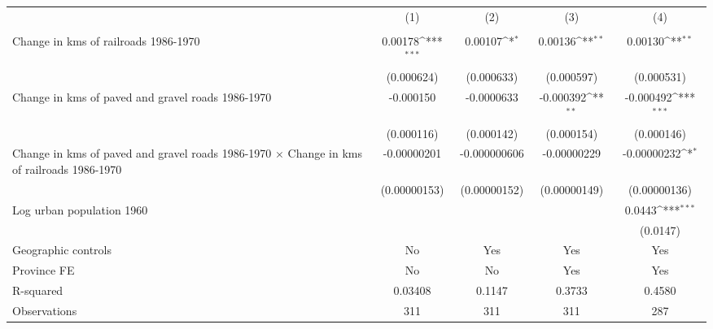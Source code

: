 {
\def\sym#1{\ifmmode^{#1}\else\(^{#1}\)\fi}
\begin{tabular}{l*{4}{c}}
\hline\hline
                &\multicolumn{1}{c}{(1)}&\multicolumn{1}{c}{(2)}&\multicolumn{1}{c}{(3)}&\multicolumn{1}{c}{(4)}\\
                &\multicolumn{1}{c}{}&\multicolumn{1}{c}{}&\multicolumn{1}{c}{}&\multicolumn{1}{c}{}\\
\hline
Change in kms of railroads 1986-1970&  0.00178\sym{***}&  0.00107\sym{*}  &  0.00136\sym{**} &  0.00130\sym{**} \\
                &(0.000624)         &(0.000633)         &(0.000597)         &(0.000531)         \\
[1em]
Change in kms of paved and gravel roads 1986-1970&-0.000150         &-0.0000633         &-0.000392\sym{**} &-0.000492\sym{***}\\
                &(0.000116)         &(0.000142)         &(0.000154)         &(0.000146)         \\
[1em]
Change in kms of paved and gravel roads 1986-1970 $\times$ Change in kms of railroads 1986-1970&-0.00000201         &-0.000000606         &-0.00000229         &-0.00000232\sym{*}  \\
                &(0.00000153)         &(0.00000152)         &(0.00000149)         &(0.00000136)         \\
[1em]
Log urban population 1960&                  &                  &                  &   0.0443\sym{***}\\
                &                  &                  &                  & (0.0147)         \\
\hline
Geographic controls&       No         &      Yes         &      Yes         &      Yes         \\
Province FE     &       No         &       No         &      Yes         &      Yes         \\
R-squared       &  0.03408         &   0.1147         &   0.3733         &   0.4580         \\
Observations    &      311         &      311         &      311         &      287         \\
\hline\hline
\end{tabular}
}
